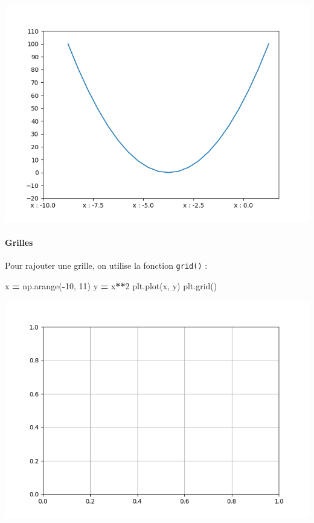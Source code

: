 \documentclass[12pt,]{book}
\newenvironment{Shaded}{\begin{snugshade}}{\end{snugshade}}
\newcommand{\DecValTok}[1]{\textcolor[rgb]{0.00,0.00,0.81}{#1}}
\newcommand{\OperatorTok}[1]{\textcolor[rgb]{0.81,0.36,0.00}{\textbf{#1}}}
\newcommand{\NormalTok}[1]{#1}
\let\oldparagraph\paragraph
\renewcommand{\paragraph}[1]{\oldparagraph{#1}\mbox{}}
\numberwithin{equation}{section}
\numberwithin{countremarque}{section}
\begin{document}
\begin{center}\includegraphics[width=9.03in]{figs/pyplot/plot_ticks_3} \end{center}

\paragraph{Grilles}\label{grilles}

Pour rajouter une grille, on utilise la fonction \texttt{grid()} :

\begin{Shaded}
\begin{Highlighting}[]
\NormalTok{x }\OperatorTok{=}\NormalTok{ np.arange(}\OperatorTok{-}\DecValTok{10}\NormalTok{, }\DecValTok{11}\NormalTok{)}
\NormalTok{y }\OperatorTok{=}\NormalTok{ x}\OperatorTok{**}\DecValTok{2}
\NormalTok{plt.plot(x, y)}
\NormalTok{plt.grid()}
\end{Highlighting}
\end{Shaded}

\begin{center}\includegraphics[width=9.03in]{figs/pyplot/plot_grid} \end{center}
\end{document}
